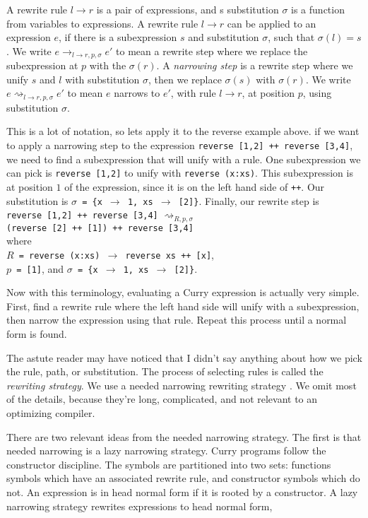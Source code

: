 A rewrite rule $l \to r$ is a pair of expressions, and
s substitution $\sigma$ is a function from variables to expressions.
A rewrite rule $l \to r$ can be applied to an expression $e$,
if there is a subexpression $s$ and substitution $\sigma$, such that $\sigma(l) = s$.
We write $e\to_{l \to r, p, \sigma} e'$ to mean a rewrite step where we replace the subexpression at $p$ with the $\sigma(r)$.
A \textit{narrowing step} is a rewrite step where we unify \cite{Klop92Handbook} $s$ and $l$ with substitution $\sigma$,
then we replace $\sigma(s)$ with $\sigma(r)$.
We write $e\rightsquigarrow_{l \to r, p, \sigma} e'$ to mean $e$ narrows to $e'$,
with rule $l \to r$, at position $p$, using substitution $\sigma$.

This is a lot of notation, so lets apply it to the reverse example above.
if we want to apply a narrowing step to the expression \texttt{reverse [1,2] ++ reverse [3,4]}, we need to find a
subexpression that will unify with a rule.
One subexpression we can pick is \texttt{reverse [1,2]} to unify with \texttt{reverse (x:xs)}.
This subexpression is at position $1$ of the expression, since it is on the left hand side of \texttt{++}.
Our substitution is \texttt{$\sigma$ = \{x $\to$ 1, xs $\to$ [2]\}}.
Finally, our rewrite step is \\
\texttt{reverse [1,2] ++ reverse [3,4]}
$\rightsquigarrow_{R , p, \sigma}$ \\
\texttt{(reverse [2] ++ [1]) ++ reverse [3,4]}\\
where \\
\texttt{$R$ = reverse (x:xs) $\to$ reverse xs ++ [x]},\\ 
\texttt{$p$ = [1]}, and
\texttt{$\sigma$ = \{x $\to$ 1, xs $\to$ [2]\}}.

Now with this terminology, evaluating a Curry expression is actually very simple.
First, find a rewrite rule where the left hand side will unify with a subexpression,
then narrow the expression using that rule.
Repeat this process until a normal form is found.

The astute reader may have noticed that
I didn't say anything about how we pick the rule, path, or substitution.
The process of selecting rules is called the \textit{rewriting strategy}.
We use a needed narrowing rewriting strategy \cite{needed}.
We omit most of the details, because they're long, complicated, and not relevant to an optimizing compiler.

There are two relevant ideas from the needed narrowing strategy.
The first is that needed narrowing is a lazy narrowing strategy.
Curry programs follow the constructor discipline.
The symbols are partitioned into two sets: 
functions symbols which have an associated rewrite rule,
and constructor symbols which do not.
An expression is in head normal form if it is rooted by a constructor.
A lazy narrowing strategy rewrites expressions to head normal form,

